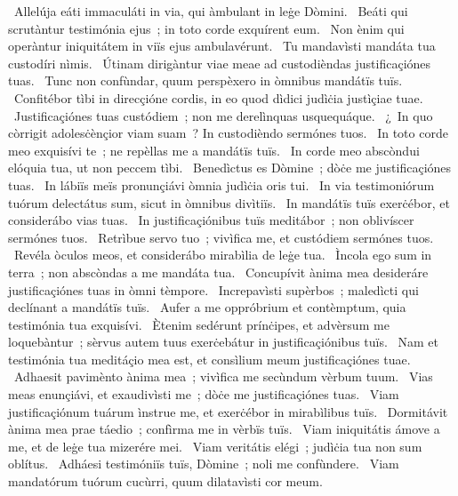{~Allelúja}
{%
eáti immaculáti in via, qui àmbulant in leġe Dòmini.
~Beáti qui scrutàntur testimónia ejus~; in toto corde exquírent eum.
~Non ènim qui operàntur iniquitátem in viïs ejus ambulavérunt.
~Tu mandavìsti mandáta tua custodíri nìmis.
~Útinam dirigàntur viae meae ad custodièndas justificaçiónes tuas.
~Tunc non confùndar, quum perspèxero in òmnibus mandátïs tuïs.
~Confitébor tìbi in direcçióne cordis, in eo quod dìdici judìċia justìçiae tuae.
~Justificaçiónes tuas custódiem~; non me derelìnquas usquequáque.
~¿~In quo còrrigit adolesċènçior viam suam~? In custodièndo sermónes tuos.
~In toto corde meo exquisívi te~; ne repèllas me a mandátïs tuïs.
~In corde meo abscòndui elóquia tua, ut non peccem tìbi.
~Benedìctus es Dòmine~; dòċe me justificaçiónes tuas.
~In lábiïs meïs pronunçiávi òmnia judìċia oris tui.
~In via testimoniórum tuórum delectátus sum, sicut in òmnibus divìtiïs.
~In mandátïs tuïs exerċébor, et considerábo vias tuas.
~In justificaçiónibus tuïs meditábor~; non oblivíscer sermónes tuos.
~Retrìbue servo tuo~; vivìfica me, et custódiem sermónes tuos.
~Revéla òculos meos, et considerábo mirabìlia de leġe tua.
~Ìncola ego sum in terra~; non abscòndas a me mandáta tua.
~Concupívit ànima mea desideráre justificaçiónes tuas in òmni tèmpore.
~Increpavìsti supèrbos~; maledìcti qui declínant a mandátïs tuïs.
~Aufer a me oppróbrium et contèmptum, quia testimónia tua exquisívi.
~Ètenim sedérunt prínċipes, et advèrsum me loquebàntur~; sèrvus autem tuus exerċebátur in justificaçiónibus tuïs.
~Nam et testimónia tua meditáçio mea est, et consìlium meum justificaçiónes tuae.
~Adhaesit pavimènto ànima mea~; vivìfica me secùndum vèrbum tuum.
~Vias meas enunçiávi, et exaudivìsti me~; dòċe me justificaçiónes tuas.
~Viam justificaçiónum tuárum ìnstrue me, et exerċébor in mirabìlibus tuïs.
~Dormitávit ànima mea prae táedio~; confìrma me in vèrbïs tuïs.
~Viam iniquitátis ámove a me, et de leġe tua mizerére mei.
~Viam veritátis elégi~; judìċia tua non sum oblítus.
~Adháesi testimóniïs tuïs, Dòmine~; noli me confùndere.
~Viam mandatórum tuórum cucùrri, quum dilatavìsti cor meum.
}
